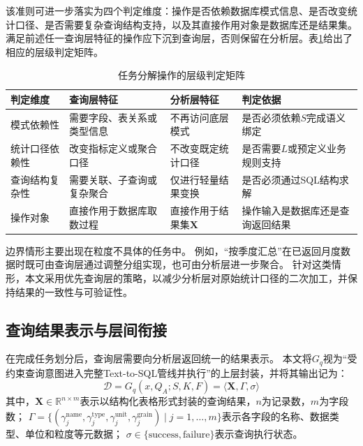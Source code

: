 该准则可进一步落实为四个判定维度：操作是否依赖数据库模式信息、是否改变统计口径、是否需要复杂查询结构支持，以及其直接作用对象是数据库还是结果集。满足前述任一查询层特征的操作应下沉到查询层，否则保留在分析层。表\ref{tab:op_decision_matrix}给出了相应的层级判定矩阵。

\begin{table}[htbp]
	\setlength{\abovecaptionskip}{5pt}
	\setlength{\belowcaptionskip}{5pt}
	\caption{任务分解操作的层级判定矩阵}\label{tab:op_decision_matrix}
	\centering
	\footnotesize
	\renewcommand{\arraystretch}{1.3}
	\begin{tabular}{p{2.0cm}p{3.3cm}p{3.5cm}p{3.6cm}}
		\toprule
		判定维度 & 查询层特征 & 分析层特征 & 判定依据 \\
		\midrule
		模式依赖性 & 需要字段、表关系或类型信息 & 不再访问底层模式 & 是否必须依赖$S$完成语义绑定 \\
		统计口径依赖性 & 改变指标定义或聚合口径 & 不改变既定统计口径 & 是否需要$L$或预定义业务规则支持 \\
		查询结构复杂性 & 需要关联、子查询或复杂聚合 & 仅进行轻量结果变换 & 是否必须通过SQL结构求解 \\
		操作对象 & 直接作用于数据库取数过程 & 直接作用于结果集$\mathbf{X}$ & 操作输入是数据库还是查询返回结果 \\
		\bottomrule
	\end{tabular}
	\renewcommand{\arraystretch}{1.0}
\end{table}

边界情形主要出现在粒度不具体的任务中。
例如，“按季度汇总”在已返回月度数据时既可由查询层通过调整分组实现，也可由分析层进一步聚合。
针对这类情形，本文采用优先查询层的策略，以减少分析层对原始统计口径的二次加工，并保持结果的一致性与可验证性。


\subsection{查询结果表示与层间衔接}\label{subsec:result_interface}

在完成任务划分后，查询层需要向分析层返回统一的结果表示。
本文将$G_q$视为“受约束查询意图进入完整Text-to-SQL管线并执行”的上层封装，并将其输出记为：
\begin{equation}
\mathcal{D} = G_q(x, Q_A; S, K, F) = \langle \mathbf{X}, \Gamma, \sigma \rangle
\label{eq:query_contract}
\end{equation}
其中，$\mathbf{X} \in \mathbb{R}^{n \times m}$表示以结构化表格形式封装的查询结果，$n$为记录数，$m$为字段数；
$\Gamma = \{(\gamma_j^{\text{name}}, \gamma_j^{\text{type}}, \gamma_j^{\text{unit}}, \gamma_j^{\text{grain}})\mid j=1,\ldots,m\}$表示各字段的名称、数据类型、单位和粒度等元数据；
$\sigma \in \{\text{success}, \text{failure}\}$表示查询执行状态。

